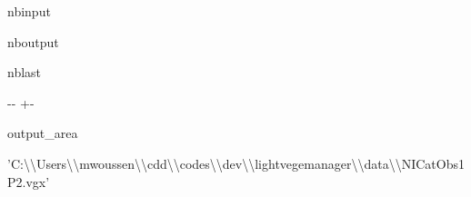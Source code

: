 \documentclass[letterpaper,10pt,english]{sphinxmanual}
\begin{document}
\begin{sphinxuseclass}{nbinput}
{
\begin{sphinxVerbatim}[commandchars=\\\{\}]
\llap{\color{nbsphinxin}[5]:\,\hspace{\fboxrule}\hspace{\fboxsep}} 

    
\end{sphinxVerbatim}
}

\end{sphinxuseclass}
\begin{sphinxuseclass}{nboutput}
\begin{sphinxuseclass}{nblast}
{

\kern-\sphinxverbatimsmallskipamount\kern-\baselineskip
\kern+\FrameHeightAdjust\kern-\fboxrule
\vspace{\nbsphinxcodecellspacing}

\begin{sphinxuseclass}{output_area}
\begin{sphinxuseclass}{}


\begin{sphinxVerbatim}[commandchars=\\\{\}]
\llap{\color{nbsphinxout}[5]:\,\hspace{\fboxrule}\hspace{\fboxsep}}'C:\textbackslash{}\textbackslash{}Users\textbackslash{}\textbackslash{}mwoussen\textbackslash{}\textbackslash{}cdd\textbackslash{}\textbackslash{}codes\textbackslash{}\textbackslash{}dev\textbackslash{}\textbackslash{}lightvegemanager\textbackslash{}\textbackslash{}data\textbackslash{}\textbackslash{}NICatObs1P2.vgx'
\end{sphinxVerbatim}



\end{sphinxuseclass}
\end{sphinxuseclass}
}

\end{sphinxuseclass}
\end{sphinxuseclass}
\end{document}
